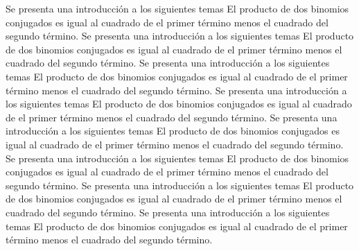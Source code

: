 \documentclass[journal]{IEEEtran}
\begin{document}
Se presenta una introducción a los siguientes temas El producto de dos binomios conjugados es igual al cuadrado de el primer término menos el cuadrado del segundo término.
Se presenta una introducción a los siguientes temas El producto de dos binomios conjugados es igual al cuadrado de el primer término menos el cuadrado del segundo término.
Se presenta una introducción a los siguientes temas El producto de dos binomios conjugados es igual al cuadrado de el primer término menos el cuadrado del segundo término.
Se presenta una introducción a los siguientes temas El producto de dos binomios conjugados es igual al cuadrado de el primer término menos el cuadrado del segundo término.
Se presenta una introducción a los siguientes temas El producto de dos binomios conjugados es igual al cuadrado de el primer término menos el cuadrado del segundo término.
Se presenta una introducción a los siguientes temas El producto de dos binomios conjugados es igual al cuadrado de el primer término menos el cuadrado del segundo término.
Se presenta una introducción a los siguientes temas El producto de dos binomios conjugados es igual al cuadrado de el primer término menos el cuadrado del segundo término.
Se presenta una introducción a los siguientes temas El producto de dos binomios conjugados es igual al cuadrado de el primer término menos el cuadrado del segundo término.

\end{document}
